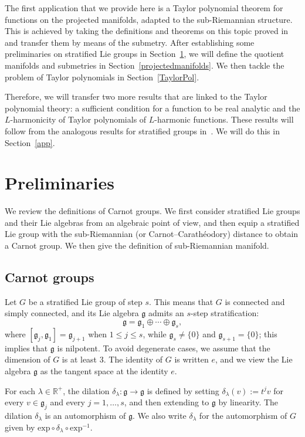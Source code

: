 \documentclass[12pt]{amsart}
\begin{document}
The first application that we provide here is a Taylor polynomial theorem for functions on the projected manifolds, adapted to the sub-Riemannian structure. This is achieved by taking the definitions and theorems on this topic proved in~\cite{FollandStein} and transfer them by means of the submetry. After establishing some preliminaries on stratified Lie groups in Section~\ref{prel}, we will define the quotient manifolds and submetries in Section~\ref{projectedmanifolds}. We then tackle the problem of Taylor polynomials in Section~\ref{TaylorPol}.

Therefore, we will transfer two more results that are linked to the Taylor polynomial theory: a sufficient condition for a function to be real analytic and the $L$-harmonicity of Taylor polynomials of $L$-harmonic functions. These results will follow from the analogous results for stratified groups in~\cite{Bonfiglioli}. We will do this in Section~\ref{app}.

  
\section{Preliminaries}\label{prel}
We review the definitions of Carnot groups.
We first consider stratified Lie groups and their Lie algebras from an algebraic point of view, and then equip a stratified Lie group with the sub-Riemannian (or Carnot--Carath\'eodory) distance to obtain a Carnot group.
We then give the definition of sub-Riemannian manifold.

\subsection{Carnot groups}
Let $G$ be a stratified Lie group of step $s$.
This means that $G$ is connected and simply connected, and its Lie algebra $\mathfrak{g}$ admits an $s$-step stratification:
\[
\mathfrak{g}= \mathfrak{g}_{1}\oplus \cdots\oplus \mathfrak{g}_{s},
\]
where $[\mathfrak{g}_{j}, \mathfrak{g}_{1}] =\mathfrak{g}_{j+1}$ when $1\leq j \leq s$, while  $\mathfrak{g}_{s}\neq \{0\}$ and $\mathfrak{g}_{s+1}=\{0\}$; this implies that $\mathfrak{g}$ is nilpotent.
To avoid degenerate cases, we assume that the dimension of $G$ is at least $3$.
The identity of $G$ is written $e$, and we view the Lie algebra $\mathfrak{g}$ as the tangent space at the identity $e$.

For each $\lambda \in \mathbb R^+$, the dilation $\delta_\lambda : \mathfrak{g} \to \mathfrak{g}$ is defined by setting $\delta_\lambda(v):=t^j v$ for every $v\in \mathfrak{g}_{j}$  and every $j=1,\dots,s$, and then extending to $\mathfrak{g}$ by linearity.
The dilation  $\delta_\lambda$ is an automorphism of $\mathfrak{g}$.
We also write $\delta_\lambda$ for the automorphism of $G$ given by $\mathrm{exp} \circ {\delta_\lambda} \circ \mathrm{exp}^{-1}$.
\end{document}
